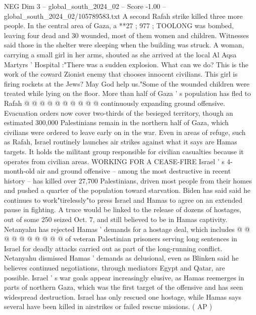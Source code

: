 \begin{textsample}{NEG Dim 3 – global\_south\_2024\_02 – Score -1.00 – global\_south\_2024\_02/105789583.txt}
A second Rafah strike killed three more people.
In the central area of Gaza, a **27 ; 977 ; TOOLONG was bombed, leaving four dead and 30 wounded, most of them women and children.
Witnesses said those in the shelter were sleeping when the building was struck.
A woman, carrying a small girl in her arms, shouted as she arrived at the local Al Aqsa Martyrs ' Hospital :"There was a sudden explosion.
What can we do?
This is the work of the coward Zionist enemy that chooses innocent civilians.
This girl is firing rockets at the Jews?
May God help us."Some of the wounded children were treated while lying on the floor.
More than half of Gaza ' s population has fled to Rafah @ @ @ @ @ @ @ @ @ @ continuously expanding ground offensive.
Evacuation orders now cover two-thirds of the besieged territory, though an estimated 300,000 Palestinians remain in the northern half of Gaza, which civilians were ordered to leave early on in the war.
Even in areas of refuge, such as Rafah, Israel routinely launches air strikes against what it says are Hamas targets.
It holds the militant group responsible for civilian casualties because it operates from civilian areas.
WORKING FOR A CEASE-FIRE Israel ' s 4-month-old air and ground offensive -- among the most destructive in recent history -- has killed over 27,700 Palestinians, driven most people from their homes and pushed a quarter of the population toward starvation.
Biden has said said he continues to work"tirelessly"to press Israel and Hamas to agree on an extended pause in fighting.
A truce would be linked to the release of dozens of hostages, out of some 250 seized Oct. 7, and still believed to be in Hamas captivity.
Netanyahu has rejected Hamas ' demands for a hostage deal, which includes @ @ @ @ @ @ @ @ @ @ of veteran Palestinian prisoners serving long sentences in Israel for deadly attacks carried out as part of the long-running conflict.
Netanyahu dismissed Hamas ' demands as delusional, even as Blinken said he believes continued negotiations, through mediators Egypt and Qatar, are possible.
Israel ' s war goals appear increasingly elusive, as Hamas reemerges in parts of northern Gaza, which was the first target of the offensive and has seen widespread destruction.
Israel has only rescued one hostage, while Hamas says several have been killed in airstrikes or failed rescue missions. ( AP )

\end{textsample}
